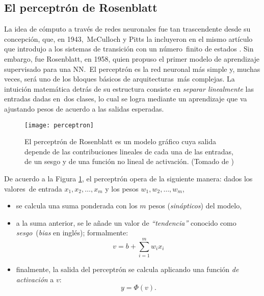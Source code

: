 \subsection{El perceptrón de Rosenblatt}

\noindent
La idea de cómputo a través de redes neuronales fue tan trascendente desde su concepción, que, en 1943,\
McCulloch y Pitts la incluyeron en el mismo artículo que introdujo a los sistemas de transición con un número\
finito de estados \cite{mcculloch:pitts}. Sin embargo, fue Rosenblatt, en 1958, quien propuso el primer modelo de aprendizaje supervisado para una NN.\
El perceptrón es la red neuronal más simple y, muchas veces, será uno de los bloques básicos de arquitecturas\
más complejas. La intuición matemática detrás de su estructura consiste en \emph{separar linealmente} las entradas dadas en\
dos clases, lo cual se logra mediante un aprendizaje que va ajustando pesos de acuerdo a las salidas esperadas.\par

\begin{figure}[H]
  \centering
  \texttt{[image: perceptron]}
  \caption{El perceptrón de Rosenblatt es un modelo gráfico cuya salida depende de las contribuciones
    lineales de cada una de las entradas, de un sesgo y de una función no lineal de activación.
    (Tomado de \cite{haykin2009})}
  \label{perceptron-fig}
\end{figure}


De acuerdo a la Figura \ref{perceptron-fig}, el perceptrón opera de la siguiente manera: dados los valores\
de entrada $x_1, x_2,\ldots, x_m$ y los pesos $w_1, w_2,\ldots, w_m$,
\begin{itemize}
\item se calcula una suma ponderada con los $m$ pesos (\emph{sinápticos}) del modelo,
\item a la suma anterior, se le añade un valor de \emph{``tendencia''} conocido como \emph{sesgo}\
  (\emph{bias} en inglés); formalmente:
  \begin{equation}
    v = b + \sum_{i=1}^{m} w_ix_i
  \end{equation}
\item finalmente, la salida del perceptrón se calcula aplicando una función \emph{de activación} a $v$:
    \begin{equation}
      y = \Phi(v).
    \end{equation}
\end{itemize}

